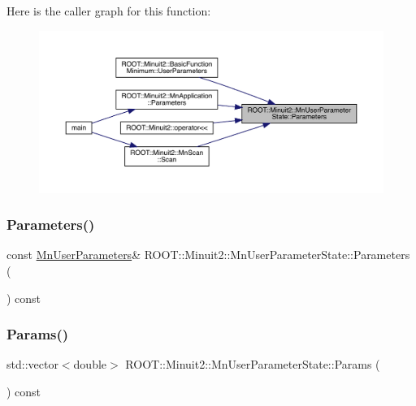Here is the caller graph for this function\+:\nopagebreak
\begin{figure}[H]
\begin{center}
\leavevmode
\includegraphics[width=350pt]{d3/de0/classROOT_1_1Minuit2_1_1MnUserParameterState_a486a8fc38e1581efd228ed43604e3fa7_icgraph}
\end{center}
\end{figure}
\mbox{\label{classROOT_1_1Minuit2_1_1MnUserParameterState_a486a8fc38e1581efd228ed43604e3fa7}} 
\subsubsection{\texorpdfstring{Parameters()}{Parameters()}\hspace{0.1cm}{\footnotesize\ttfamily [2/2]}}
{\footnotesize\ttfamily const \mbox{\hyperlink{classROOT_1_1Minuit2_1_1MnUserParameters}{Mn\+User\+Parameters}}\& R\+O\+O\+T\+::\+Minuit2\+::\+Mn\+User\+Parameter\+State\+::\+Parameters (\begin{DoxyParamCaption}{ }\end{DoxyParamCaption}) const\hspace{0.3cm}{\ttfamily [inline]}}

\mbox{\label{classROOT_1_1Minuit2_1_1MnUserParameterState_acbdb3b1b3d7f4b9889bf10c2ac3e0785}} 
\subsubsection{\texorpdfstring{Params()}{Params()}\hspace{0.1cm}{\footnotesize\ttfamily [1/2]}}
{\footnotesize\ttfamily std\+::vector$<$double$>$ R\+O\+O\+T\+::\+Minuit2\+::\+Mn\+User\+Parameter\+State\+::\+Params (\begin{DoxyParamCaption}{ }\end{DoxyParamCaption}) const}

